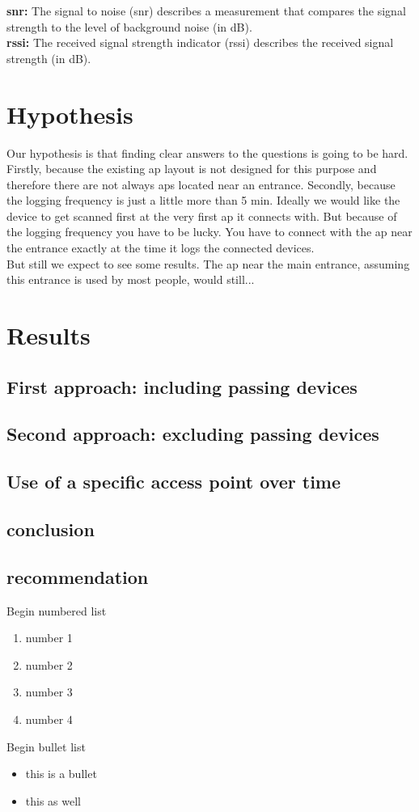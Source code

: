 \textbf{snr:}
The signal to noise (snr) describes a measurement that compares the signal strength to the level of background noise (in dB).
\\
\textbf{rssi:}
The received signal strength indicator (rssi) describes the received signal strength (in dB).




\section{Hypothesis}\label{hypo}
Our hypothesis is that finding clear answers to the questions is going to be hard. Firstly, because the existing ap layout is not designed for this purpose and therefore there are not always aps located near an entrance. Secondly, because the logging frequency is just a little more than 5 min. Ideally we would like the device to get scanned first at the very first ap it connects with. But because  of the logging frequency you have to be lucky. You have to connect with the ap near the entrance exactly at the time it logs the connected devices. 
\\
But still we expect to see some results. The ap near the main entrance, assuming this entrance is used by most people, would still...

\section{Results}\label{results}
\subsection{First approach: including passing devices}
\subsection{Second approach: excluding passing devices}
\subsection{Use of a specific access point over time}
\subsection{conclusion}
\subsection{recommendation}


Begin numbered list
\begin{enumerate}
\item number 1
\item number 2
\item number 3
\item number 4
\end{enumerate}
Begin bullet list
\begin{itemize}
\item this is a bullet
\item this as well
\end{itemize}



